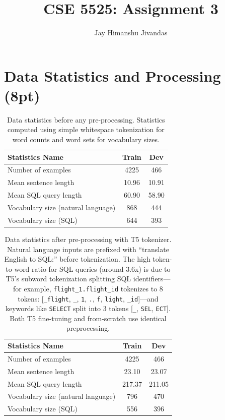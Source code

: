 \documentclass{article}
\title{CSE 5525: Assignment 3}
\author{Jay Himanshu Jivandas}
\date{}
\begin{document}
\maketitle


\section{Data Statistics and Processing (8pt)}

\begin{table}[h!]
\centering
\begin{tabular}{lcc}
\toprule
Statistics Name & Train & Dev \\
\midrule
Number of examples & 4225 & 466 \\
Mean sentence length & 10.96 & 10.91 \\
Mean SQL query length & 60.90 & 58.90 \\
Vocabulary size (natural language) & 868 & 444 \\
Vocabulary size (SQL) & 644 & 393 \\
\bottomrule
\end{tabular}
\caption{Data statistics before any pre-processing. Statistics computed using simple whitespace tokenization for word counts and word sets for vocabulary sizes.}
\label{tab:data_stats_before}
\end{table}

\begin{table}[h!]
\centering
\begin{tabular}{lcc}
\toprule
Statistics Name & Train & Dev \\
\midrule
Number of examples & 4225 & 466 \\
Mean sentence length & 23.10 & 23.07 \\
Mean SQL query length & 217.37 & 211.05 \\
Vocabulary size (natural language) & 796 & 470 \\
Vocabulary size (SQL) & 556 & 396 \\
\bottomrule
\end{tabular}
\caption{Data statistics after pre-processing with T5 tokenizer. Natural language inputs are prefixed with ``translate English to SQL:'' before tokenization. The high token-to-word ratio for SQL queries (around 3.6x) is due to T5's subword tokenization splitting SQL identifiers---for example, \texttt{flight\_1.flight\_id} tokenizes to 8 tokens: [\texttt{\_flight}, \texttt{\_}, \texttt{1}, \texttt{.}, \texttt{f}, \texttt{light}, \texttt{\_id}]---and keywords like \texttt{SELECT} split into 3 tokens [\texttt{\_}, \texttt{SEL}, \texttt{ECT}]. Both T5 fine-tuning and from-scratch use identical preprocessing.}
\label{tab:data_stats_after}
\end{table}
\end{document}
